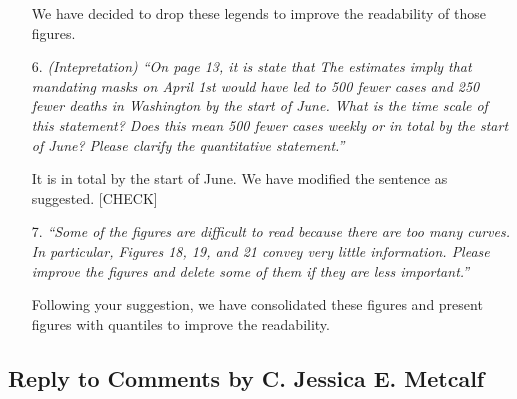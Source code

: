 \documentclass[11pt]{article}
\begin{document}
\begin{itemize}
We have decided to drop these legends to improve the readability of those figures. 

\item[6. ]  \textit{(Intepretation) ``On page 13, it is state that
The estimates imply that mandating masks on April 1st would have led to 500
fewer cases and 250 fewer deaths in Washington by the start of June.
What is the time scale of this statement? Does this mean 500 fewer cases weekly or in total
by the start of June? Please clarify the quantitative statement.''}

It is in total by the start of June. We have modified the sentence as suggested.  
[CHECK]

\item[7.]  \textit{``Some of the figures are difficult to read because there are too many curves. In particular,
Figures 18, 19, and 21 convey very little information. Please improve the figures and delete
some of them if they are less important.''}

Following your suggestion, we have consolidated these figures and present figures with quantiles to improve the readability.

\end{itemize} 
 
\newpage

\replytitle
\subsection*{Reply to Comments by C. Jessica E. Metcalf }

\changes
\end{document}
